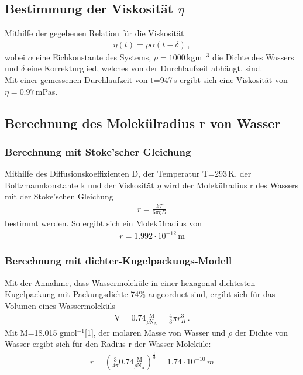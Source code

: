 \documentclass[]{scrartcl}
\begin{document}
\subsection{Bestimmung der Viskosität $\eta$}
Mithilfe der gegebenen Relation für die Viskosität
\begin{align*}
\eta(t)=\rho \alpha (t-\delta)\, ,
\end{align*}
wobei $\alpha$ eine Eichkonstante des Systems, $\rho=1000$\,kgm$^{-3}$ die Dichte des Wassers und $\delta$ eine Korrekturglied, welches von der Durchlaufzeit abhängt, sind. \\
Mit einer gemessenen Durchlaufzeit von t=947\,s ergibt sich eine Viskosität von $\eta=0.97$\,mPas.
\subsection{Berechnung des Molekülradius r von Wasser}
\subsubsection{Berechnung mit Stoke'scher Gleichung}
Mithilfe des Diffusionskoeffizienten D, der Temperatur T=293\,K, der Boltzmannkonstante k und der Viskosität $\eta$ wird der Molekülradius r des Wassers mit der Stoke'schen Gleichung
\begin{align*}
r=\frac{kT}{6\pi \eta D}
\end{align*}
bestimmt werden. So ergibt sich ein Molekülradius von
\begin{align*}
r = 1.992\cdot10^{-12}\,\text{m}
\end{align*}
\subsubsection{Berechnung mit dichter-Kugelpackungs-Modell}
Mit der Annahme, dass Wassermoleküle in einer hexagonal dichtesten Kugelpackung mit Packungsdichte 74\% angeordnet sind, ergibt sich für das Volumen eines Wassermoleküls
\begin{align*}
\text{V}=0.74 \frac{\text{M}}{\rho \text{N}_{\text{A}}}=\frac{4}{3}\pi r_H^3\,.
\end{align*}
Mit M=18.015 gmol$^{-1}$[1], der molaren Masse von Wasser und $\rho$ der Dichte von Wasser ergibt sich für den Radius r der Wasser-Moleküle:
\begin{align*}
r = \left( \frac{3}{4\pi}0.74\frac{\text{M}}{\rho \text{N}_{\text{A}}}\right)^{\frac{1}{3}}=1.74\cdot10^{-10}\,m
\end{align*}
\end{document}
